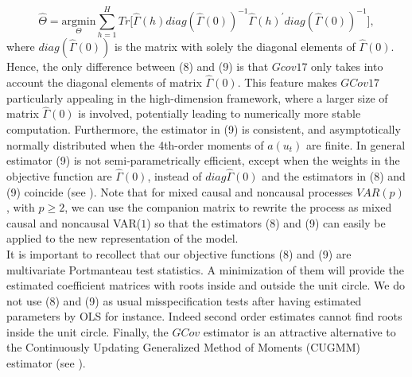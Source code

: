 \documentclass[<1p>]{elsarticle} %
\begin{document}
\begin{equation}
	\hat{\Theta}= \underset{\Theta}{\mathrm{argmin}} \sum_{h=1}^{H} Tr \bigl[  \hat{\Gamma} (h)  
     diag(\hat{\Gamma}(0))^{-1} 
  \hat{\Gamma}(h)^{\prime} 
     diag(\hat{\Gamma}(0))^{-1} 
 \Bigr],
\end{equation}
where $diag(\hat{\Gamma}(0))$ is the matrix with solely the diagonal elements of $\hat{\Gamma}(0)$. Hence, the only difference between (8) and (9) is that $Gcov17$ only takes into account the diagonal elements of matrix $\hat{\Gamma}(0)$. This feature makes $GCov17$ particularly appealing in the high-dimension framework, where a larger size of matrix $\hat{\Gamma}(0)$ is involved, potentially leading to numerically more stable computation. Furthermore, the estimator in (9) is consistent, and asymptotically normally distributed when the 4th-order moments of $a(u_t)$ are finite. In general estimator (9) is not semi-parametrically efficient, except when the weights in the objective function are $\hat{\Gamma}(0)$, instead of $diag \hat{\Gamma}(0)$ and the estimators in (8) and (9) coincide  (see \cite{gourieroux2017noncausal}). Note that for mixed causal and noncausal processes $VAR(p)$, with $p \geq 2$, we can use the companion matrix to rewrite the process as mixed causal and noncausal VAR($1$) so that the estimators (8) and (9) can easily be applied to the new representation of the model.\\
\indent It is important to recollect that our objective functions (8) and (9) are multivariate Portmanteau test statistics. A minimization of them will provide the estimated coefficient matrices with roots inside and outside the unit circle. We do not use (8) and (9) as usual misspecification tests after having estimated parameters by OLS for instance. Indeed second order estimates cannot find roots inside the unit circle. Finally, the $GCov$ estimator is an attractive alternative to the Continuously Updating Generalized Method of Moments (CUGMM) estimator (see \cite{hansen1996finite}). 
\end{document}
